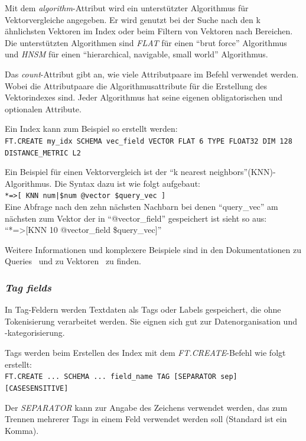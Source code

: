 Mit dem \emph{algorithm}-Attribut wird ein unterstützter Algorithmus für Vektorvergleiche angegeben. Er wird genutzt bei der Suche nach den k ähnlichsten Vektoren im Index oder beim Filtern von Vektoren nach Bereichen. Die unterstützten Algorithmen sind \emph{FLAT} für einen \enquote{brut force} Algorithmus und \emph{HNSM} für einen \enquote{hierarchical, navigable, small world} Algorithmus.

Das \emph{count}-Attribut gibt an, wie viele Attributpaare im Befehl verwendet werden. Wobei die Attributpaare die Algorithmusattribute für die Erstellung des Vektorindexes sind. Jeder Algorithmus hat seine eigenen obligatorischen und optionalen Attribute.

Ein Index kann zum Beispiel so erstellt werden:\\
\texttt{FT.CREATE my\_idx SCHEMA vec\_field VECTOR FLAT 6 TYPE FLOAT32 DIM 128 DISTANCE\_METRIC L2}

Ein Beispiel für einen Vektorvergleich ist der \enquote{k nearest neighbors}(KNN)-Algorithmus. Die Syntax dazu ist wie folgt aufgebaut:\\
\texttt{*=>[ KNN {num|\$num} @vector \$query\_vec ]}\\
Eine Abfrage nach den zehn nächsten Nachbarn bei denen \enquote{query\_vec} am nächsten zum Vektor der in \enquote{@vector\_field} gespeichert ist sieht so aus:\\
\enquote{*=>[KNN 10 @vector\_field \$query\_vec]}

Weitere Informationen und komplexere Beispiele sind in den Dokumentationen zu Queries~\cite{redis_ltd_query_nodate} und zu Vektoren~\cite{redis_ltd_vectors_nodate} zu finden.


\subsubsection{\emph{Tag fields}} In Tag-Feldern werden Textdaten als Tags oder Labels gespeichert, die ohne Tokenisierung verarbeitet werden. Sie eignen sich gut zur Datenorganisation und -kategorisierung.

Tags werden beim Erstellen des Index mit dem \emph{FT.CREATE}-Befehl wie folgt erstellt:\\
\texttt{FT.CREATE ... SCHEMA ... {field\_name} TAG [SEPARATOR {sep}] [CASESENSITIVE]}

Der \emph{SEPARATOR} kann zur Angabe des Zeichens verwendet werden, das zum Trennen mehrerer Tags in einem Feld verwendet werden soll (Standard ist ein Komma).

